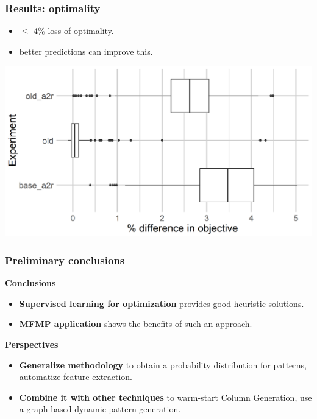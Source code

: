 \begin{frame}
\frametitle{\textbf{Results: optimality}}

  \begin{itemize}[<+->]
    \item $\le$ 4\% loss of optimality.
    \item better predictions can improve this.
  \end{itemize}

  \includegraphics[width=0.8\linewidth]{images/quality_degradation_2tasks}

\end{frame}

\begin{frame}
\frametitle{\textbf{Preliminary conclusions}}
  \pause
  \begin{block}{\textbf{Conclusions}}
    \begin{itemize}[<+->]
    \item \textbf{Supervised learning for optimization}
      provides good heuristic solutions.
    \item \textbf{MFMP application}
      shows the benefits of such an approach.
    \end{itemize}
  \end{block}  
  \pause
  \begin{block}{\textbf{Perspectives}}
    \begin{itemize}[<+->]
      \item \textbf{Generalize methodology} 
        to obtain a probability distribution for patterns, automatize feature extraction.
      \item \textbf{Combine it with other techniques} 
        to warm-start Column Generation, use a graph-based dynamic pattern generation.
    \end{itemize}
  \end{block}  
\end{frame}